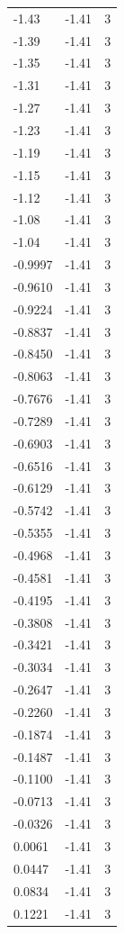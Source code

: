 \begin{longtable}{lrr}
  -1.43 & -1.41 & 3 \\
  -1.39 & -1.41 & 3 \\
  -1.35 & -1.41 & 3 \\
  -1.31 & -1.41 & 3 \\
  -1.27 & -1.41 & 3 \\
  -1.23 & -1.41 & 3 \\
  -1.19 & -1.41 & 3 \\
  -1.15 & -1.41 & 3 \\
  -1.12 & -1.41 & 3 \\
  -1.08 & -1.41 & 3 \\
  -1.04 & -1.41 & 3 \\
  -0.9997 & -1.41 & 3 \\
  -0.9610 & -1.41 & 3 \\
  -0.9224 & -1.41 & 3 \\
  -0.8837 & -1.41 & 3 \\
  -0.8450 & -1.41 & 3 \\
  -0.8063 & -1.41 & 3 \\
  -0.7676 & -1.41 & 3 \\
  -0.7289 & -1.41 & 3 \\
  -0.6903 & -1.41 & 3 \\
  -0.6516 & -1.41 & 3 \\
  -0.6129 & -1.41 & 3 \\
  -0.5742 & -1.41 & 3 \\
  -0.5355 & -1.41 & 3 \\
  -0.4968 & -1.41 & 3 \\
  -0.4581 & -1.41 & 3 \\
  -0.4195 & -1.41 & 3 \\
  -0.3808 & -1.41 & 3 \\
  -0.3421 & -1.41 & 3 \\
  -0.3034 & -1.41 & 3 \\
  -0.2647 & -1.41 & 3 \\
  -0.2260 & -1.41 & 3 \\
  -0.1874 & -1.41 & 3 \\
  -0.1487 & -1.41 & 3 \\
  -0.1100 & -1.41 & 3 \\
  -0.0713 & -1.41 & 3 \\
  -0.0326 & -1.41 & 3 \\
  0.0061 & -1.41 & 3 \\
  0.0447 & -1.41 & 3 \\
  0.0834 & -1.41 & 3 \\
  0.1221 & -1.41 & 3 \\

\end{longtable}
